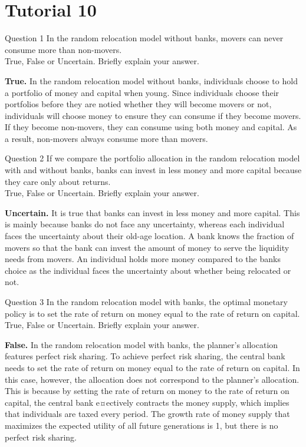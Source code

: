 \documentclass[a4paper]{article}
\newif\IfInSansMode
\numberwithin{equation}{section}
\numberwithin{figure}{section}
\begin{document}
\section{Tutorial 10}
	\begin{questionbox}{Question 1}
		In the random relocation model without banks, movers can never consume more than non-movers.\\
		True, False or Uncertain. Briefly explain your answer.
		\begin{explanationbox}
			\textbf{True.} In the random relocation model without banks, individuals choose to hold a portfolio of money and capital when young. Since individuals choose their portfolios before they are notied whether they will become movers or not, individuals will choose money to ensure they can consume if they become movers. If they become non-movers, they can consume using both money and capital. As a result, non-movers always consume more than movers.
		\end{explanationbox}
	\end{questionbox}
	\begin{questionbox}{Question 2}
		If we compare the portfolio allocation in the random relocation model with and without banks, banks can invest in less money and more capital because they care only about returns.\\
		True, False or Uncertain. Briefly explain your answer.
		\begin{explanationbox}
			\textbf{Uncertain.} It is true that banks can invest in less money and more capital. This is mainly because banks do not face any uncertainty, whereas each individual faces the uncertainty about their old-age location. A bank knows the fraction of movers so that the bank can invest the amount of money to serve the liquidity needs from movers. An individual holds more money compared to the banks choice as the individual faces the uncertainty about whether being relocated or not.
		\end{explanationbox}
	\end{questionbox}
	\begin{questionbox}{Question 3}
		In the random relocation model with banks, the optimal monetary policy is to set the rate of return on money equal to the rate of return on capital.\\
		True, False or Uncertain. Briefly explain your answer.
		\begin{explanationbox}
			\textbf{False.} In the random relocation model with banks, the planner's allocation features perfect risk sharing. To achieve perfect risk sharing, the central bank needs to set the rate of return on money equal to the rate of return on capital. In this case, however, the allocation does not correspond to the planner's allocation. This is because by setting the rate of return on money to the rate of return on capital, the central bank e¤ectively contracts the money supply, which implies that individuals are taxed every period. The growth rate of money supply that maximizes the expected utility of all future generations is 1, but there is no perfect risk sharing.
		\end{explanationbox}
	\end{questionbox}
\end{document}
